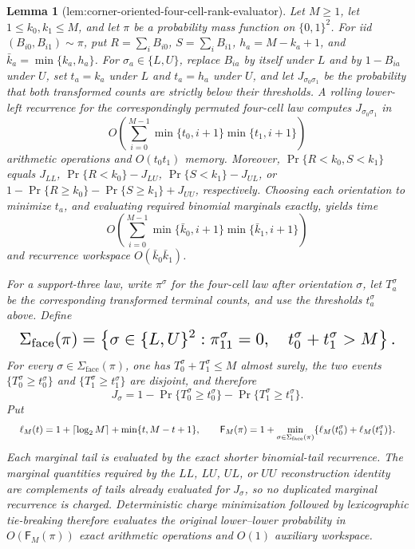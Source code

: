 \documentclass{article}
\newtheorem{lemma}{Lemma}
\begin{document}
\begin{lemma}[lem:corner-oriented-four-cell-rank-evaluator]\label{lem:corner-oriented-four-cell-rank-evaluator}
Let \(M\ge1\), let \(1\le k_0,k_1\le M\), and let \(\pi\) be a probability mass function on \(\{0,1\}^2\). For iid \((B_{i0},B_{i1})\sim\pi\), put \(R=\sum_iB_{i0}\), \(S=\sum_iB_{i1}\), \(h_a=M-k_a+1\), and \(\bar k_a=\min\{k_a,h_a\}\). For \(\sigma_a\in\{L,U\}\), replace \(B_{ia}\) by itself under \(L\) and by \(1-B_{ia}\) under \(U\), set \(t_a=k_a\) under \(L\) and \(t_a=h_a\) under \(U\), and let \(J_{\sigma_0\sigma_1}\) be the probability that both transformed counts are strictly below their thresholds. A rolling lower-left recurrence for the correspondingly permuted four-cell law computes \(J_{\sigma_0\sigma_1}\) in
\[
O\!\left(\sum_{i=0}^{M-1}\min\{t_0,i+1\}\min\{t_1,i+1\}\right)
\]
arithmetic operations and \(O(t_0t_1)\) memory. Moreover, \(\Pr\{R<k_0,S<k_1\}\) equals \(J_{LL}\), \(\Pr\{R<k_0\}-J_{LU}\), \(\Pr\{S<k_1\}-J_{UL}\), or \(1-\Pr\{R\ge k_0\}-\Pr\{S\ge k_1\}+J_{UU}\), respectively. Choosing each orientation to minimize \(t_a\), and evaluating required binomial marginals exactly, yields time
\[
O\!\left(\sum_{i=0}^{M-1}\min\{\bar k_0,i+1\}\min\{\bar k_1,i+1\}\right)
\]
and recurrence workspace \(O(\bar k_0\bar k_1)\).

For a support-three law, write \(\pi^\sigma\) for the four-cell law after orientation \(\sigma\), let \(T_a^\sigma\) be the corresponding transformed terminal counts, and use the thresholds \(t_a^\sigma\) above. Define
\[
\makebox[\linewidth][c]{\resizebox{0.98\linewidth}{!}{\(\displaystyle \Sigma_{\mathrm{face}}(\pi)=
\left\{\sigma\in\{L,U\}^2:
\pi^\sigma_{11}=0,\quad t_0^\sigma+t_1^\sigma>M\right\}.\)}}
\]
For every \(\sigma\in\Sigma_{\mathrm{face}}(\pi)\), one has \(T_0^\sigma+T_1^\sigma\le M\) almost surely, the two events \(\{T_0^\sigma\ge t_0^\sigma\}\) and \(\{T_1^\sigma\ge t_1^\sigma\}\) are disjoint, and therefore
\[
J_\sigma
=1-\Pr\{T_0^\sigma\ge t_0^\sigma\}
 -\Pr\{T_1^\sigma\ge t_1^\sigma\}.
\]
Put
\[
\makebox[\linewidth][c]{\resizebox{0.98\linewidth}{!}{\(\displaystyle \ell_M(t)=1+\lceil\log_2 M\rceil+\min\{t,M-t+1\},
\qquad
\mathsf F_M(\pi)=
1+\min_{\sigma\in\Sigma_{\mathrm{face}}(\pi)}
\{\ell_M(t_0^\sigma)+\ell_M(t_1^\sigma)\}.\)}}
\]
Each marginal tail is evaluated by the exact shorter binomial-tail recurrence. The marginal quantities required by the \(LL\), \(LU\), \(UL\), or \(UU\) reconstruction identity are complements of tails already evaluated for \(J_\sigma\), so no duplicated marginal recurrence is charged. Deterministic charge minimization followed by lexicographic tie-breaking therefore evaluates the original lower--lower probability in \(O(\mathsf F_M(\pi))\) exact arithmetic operations and \(O(1)\) auxiliary workspace.


\end{lemma}
\end{document}

